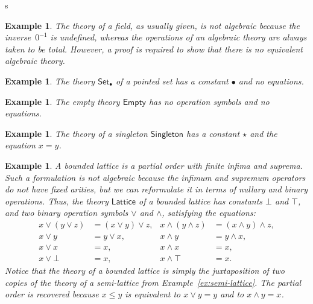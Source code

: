 s\documentclass{amsart}
\newcommand{\theory}[1]{\mathsf{#1}} %
\newtheorem{example}[definition]{Example}
\begin{document}
\begin{example}
  \label{ex:field}
  The theory of a field, as usually given, is not algebraic because the inverse~$0^{-1}$
  is undefined, whereas the operations of an algebraic theory are always taken to be
  total. However, a proof is required to show that there is no equivalent algebraic theory.
\end{example}

\begin{example}
  \label{ex:pointed-set}
  The theory $\theory{Set_\bullet}$ of a \emph{pointed set} has a constant $\bullet$ and
  no equations.
\end{example}

\begin{example}
  \label{ex:theory-empty}
  The \emph{empty theory $\theory{Empty}$} has no operation symbols and no equations.
\end{example}

\begin{example}
  \label{ex:theory-singleton}
  The theory of a \emph{singleton $\theory{Singleton}$} has a constant $\star$ and the
  equation $x = y$.
\end{example}

\begin{example}
  \label{ex:lattice}
  A bounded lattice is a partial order with finite infima and suprema. Such a formulation
  is not algebraic because the infimum and supremum operators do not have fixed arities,
  but we can reformulate it in terms of nullary and binary operations. Thus, the theory
  $\theory{Lattice}$ of a bounded lattice has constants $\bot$ and $\top$, and two binary
  operation symbols $\vee$ and $\wedge$, satisfying the equations:
  \begin{align*}
    x \vee (y \vee z) &= (x \vee y) \vee z,   &      x \wedge (y \wedge z) &= (x \wedge y) \wedge z,\\
    x \vee y &= y \vee x,                     &      x \wedge y &= y \wedge x,\\
    x \vee x &= x,                            &      x \wedge x &= x,\\
    x \vee \bot &= x,                         &      x \wedge \top &= x.
  \end{align*}
  Notice that the theory of a bounded lattice is simply the juxtaposition of two copies of
  the theory of a semi-lattice from Example~\ref{ex:semi-lattice}. The partial order is
  recovered because $x \leq y$ is equivalent to $x \vee y = y$ and to $x \wedge y = x$.
\end{example}
\end{document}
